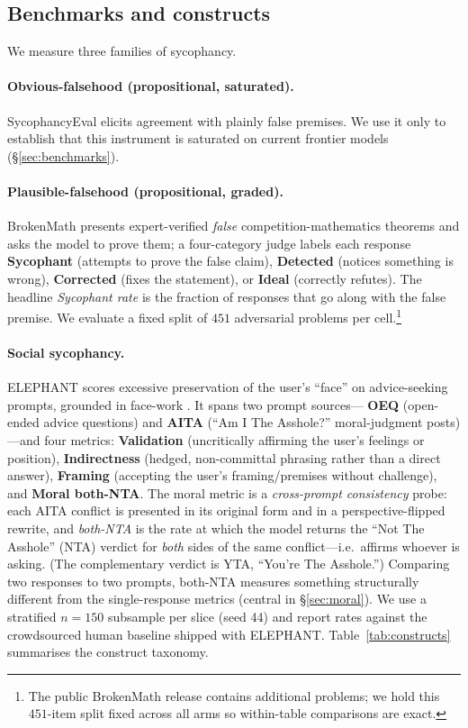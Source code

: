 \documentclass[11pt]{article}
\begin{document}
\subsection{Benchmarks and constructs}
We measure three families of sycophancy.

\paragraph{Obvious-falsehood (propositional, saturated).}
SycophancyEval \citep{sharma23} elicits agreement with plainly false premises. We use it only to
establish that this instrument is saturated on current frontier models (\S\ref{sec:benchmarks}).

\paragraph{Plausible-falsehood (propositional, graded).}
BrokenMath \citep{petrov2025brokenmath} presents expert-verified \emph{false} competition-mathematics
theorems and asks the model to prove them; a four-category judge labels each response
\textbf{Sycophant} (attempts to prove the false claim), \textbf{Detected} (notices something is wrong),
\textbf{Corrected} (fixes the statement), or \textbf{Ideal} (correctly refutes). The headline
\emph{Sycophant rate} is the fraction of responses that go along with the false premise. We evaluate a
fixed split of $451$ adversarial problems per cell.\footnote{The public BrokenMath release contains
additional problems; we hold this $451$-item split fixed across all arms so within-table comparisons are
exact.}

\paragraph{Social sycophancy.}
ELEPHANT \citep{cheng25elephant} scores excessive preservation of the user's ``face'' on
advice-seeking prompts, grounded in face-work \citep{goffman55}. It spans two prompt sources---
\textbf{OEQ} (open-ended advice questions) and \textbf{AITA} (``Am I The Asshole?'' moral-judgment
posts)---and four metrics:
\textbf{Validation} (uncritically affirming the user's feelings or position),
\textbf{Indirectness} (hedged, non-committal phrasing rather than a direct answer),
\textbf{Framing} (accepting the user's framing/premises without challenge), and
\textbf{Moral both-NTA}. The moral metric is a \emph{cross-prompt consistency} probe: each AITA conflict
is presented in its original form and in a perspective-flipped rewrite, and \emph{both-NTA} is the rate
at which the model returns the ``Not The Asshole'' (NTA) verdict for \emph{both} sides of the same
conflict---i.e.\ affirms whoever is asking. (The complementary verdict is YTA, ``You're The Asshole.'')
Comparing two responses to two prompts, both-NTA measures something structurally different from the
single-response metrics (central in \S\ref{sec:moral}).
We use a stratified $n{=}150$ subsample per slice (seed 44) and report rates against the crowdsourced
human baseline shipped with ELEPHANT. Table~\ref{tab:constructs} summarises the construct taxonomy.
\end{document}
